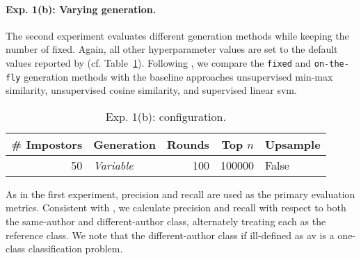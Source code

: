 \paragraph{Exp. 1(b): Varying \imp{} generation.}
The second experiment evaluates different \imp{} generation methods while keeping the number of \imps{} fixed.
Again, all other hyperparameter values are set to the default values reported by \citet{koppel_determining_2014} (cf. Table~\ref{tab:repr_exp2}). 
Following \citet{koppel_determining_2014}, we compare the \texttt{fixed} and \texttt{on-the-fly} \imp{} generation methods with the baseline approaches unsupervised min-max similarity, unsupervised cosine similarity, and supervised linear \ac{svm}.

\begin{table}[h]
\centering\small
\caption{Exp. 1(b): \impAppr{} configuration.}
\label{tab:repr_exp2}
\begin{tabular}{@{}rlrrl@{}}   %
\toprule
\# Impostors & Generation & Rounds & Top $n$ & Upsample \\
\midrule
50 & \textit{Variable} & 100 & \num{100000} & False \\
\bottomrule
\end{tabular}%
\end{table}

As in the first experiment, precision and recall are used as the primary evaluation metrics. 
Consistent with \citet{koppel_determining_2014}, we calculate precision and recall with respect to both the same-author and different-author class, alternately treating each as the reference class.
We note that the different-author class if ill-defined as \ac{av} is a one-class classification problem.
